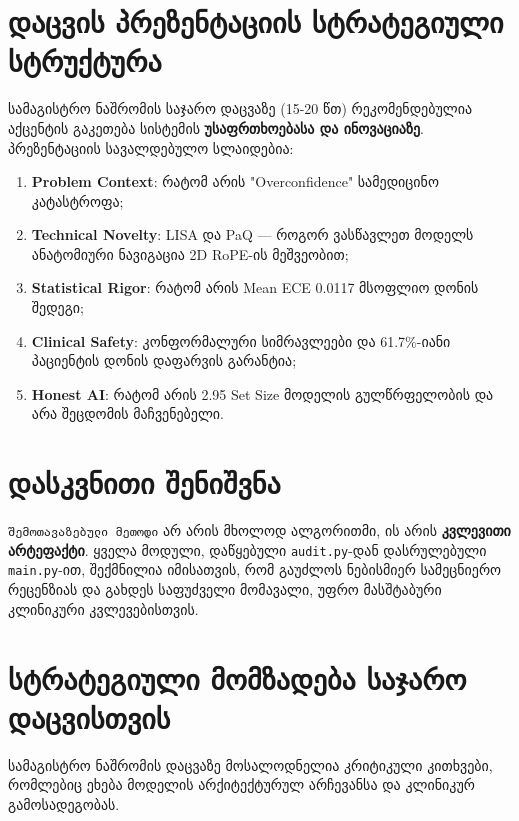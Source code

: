 \documentclass[12pt,a4paper,oneside]{report}
\begin{document}
\section{დაცვის პრეზენტაციის სტრატეგიული სტრუქტურა}
სამაგისტრო ნაშრომის საჯარო დაცვაზე (15-20 წთ) რეკომენდებულია აქცენტის გაკეთება სისტემის \textbf{უსაფრთხოებასა და ინოვაციაზე}. პრეზენტაციის სავალდებულო სლაიდებია:
\begin{enumerate}[leftmargin=1.6em]
    \item \textbf{Problem Context}: რატომ არის "Overconfidence" სამედიცინო კატასტროფა;
    \item \textbf{Technical Novelty}: LISA და PaQ — როგორ ვასწავლეთ მოდელს ანატომიური ნავიგაცია 2D RoPE-ის მეშვეობით;
    \item \textbf{Statistical Rigor}: რატომ არის Mean ECE 0.0117 მსოფლიო დონის შედეგი;
    \item \textbf{Clinical Safety}: კონფორმალური სიმრავლეები და 61.7\%-იანი პაციენტის დონის დაფარვის გარანტია;
    \item \textbf{Honest AI}: რატომ არის 2.95 Set Size მოდელის გულწრფელობის და არა შეცდომის მაჩვენებელი.
\end{enumerate}

\section{დასკვნითი შენიშვნა}
\texttt{შემოთავაზებული მეთოდი} არ არის მხოლოდ ალგორითმი, ის არის \textbf{კვლევითი არტეფაქტი}. ყველა მოდული, დაწყებული \texttt{audit.py}-დან დასრულებული \texttt{main.py}-ით, შექმნილია იმისათვის, რომ გაუძლოს ნებისმიერ სამეცნიერო რეცენზიას და გახდეს საფუძველი მომავალი, უფრო მასშტაბური კლინიკური კვლევებისთვის.

\section{სტრატეგიული მომზადება საჯარო დაცვისთვის}
სამაგისტრო ნაშრომის დაცვაზე მოსალოდნელია კრიტიკული კითხვები, რომლებიც ეხება მოდელის არქიტექტურულ არჩევანსა და კლინიკურ გამოსადეგობას.
\end{document}
